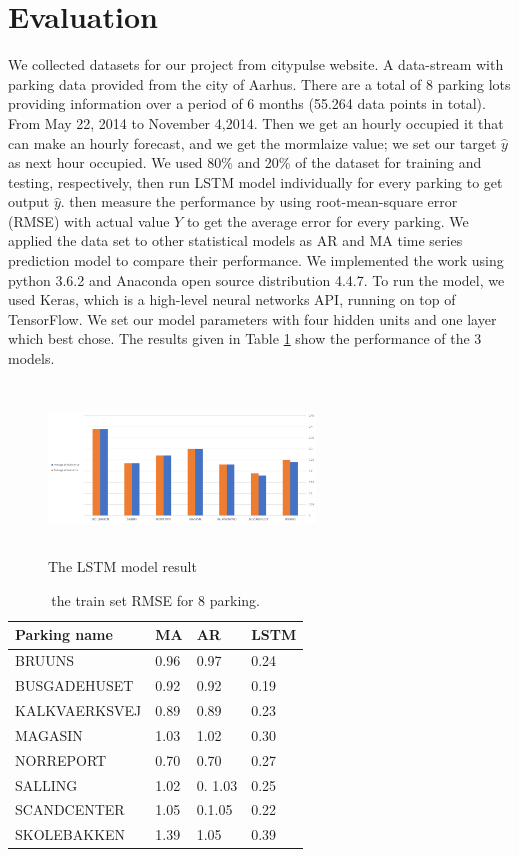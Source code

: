\documentclass[10pt, conference, compsocconf]{IEEEtran}
\begin{document}
\section{Evaluation}
We collected datasets for our project from citypulse website. A data-stream with parking data provided from the city of Aarhus. There are a total of 8 parking lots providing information over a period of 6 months (55.264 data points in total). From May 22, 2014 to November 4,2014. Then we get an hourly occupied it that can make an hourly forecast, and  we get the  mormlaize value; we set our target $\hat y$ as next hour occupied. We used 80\% and 20\% of the dataset for training and testing, respectively, then run LSTM model individually for every parking to get output $\hat y $.  then measure the performance by using root-mean-square error (RMSE) with actual value \(Y\) to get the average error for every parking. We applied the data set to other statistical models as AR and MA time series prediction model to compare their performance. 
We implemented the work using python 3.6.2 and Anaconda open source distribution 4.4.7. To run the model, we used Keras, which is a high-level neural networks API, running on top of TensorFlow. We set our model parameters with four hidden units and one layer which best chose. The results given in Table \ref{table:1} show the  performance of the 3 models.
\begin{figure}[h]
 \includegraphics[width=7.1cm, height=4.5cm]{result}
 \caption{\footnotesize The LSTM model result}
 \label{fig:result}
\end{figure}
\begin{table}[h!]
\begin{tabular}{ | m{3cm} | m{1cm}| m{1cm} | m{1cm} | } 
\hline
Parking name & MA & AR& LSTM\\ 
\hline
BRUUNS& 0.96 & 0.97 &0.24\\ 
\hline
BUSGADEHUSET & 0.92 & 0.92&0.19 \\ 
\hline
KALKVAERKSVEJ & 0.89 & 0.89 &0.23\\ 
\hline
MAGASIN & 1.03 & 1.02& 0.30\\ 
\hline
NORREPORT & 0.70 &0.70 &0.27\\ 
\hline
SALLING & 1.02 & 0. 1.03&0.25\\ 
\hline
SCANDCENTER & 1.05 & 0.1.05& 0.22\\ 
\hline
SKOLEBAKKEN & 1.39 & 1.05& 0.39\\ 
\hline
\end{tabular}

\caption{\footnotesize the train set RMSE for 8 parking.}
\label{table:1}
\end{table}
\end{document}
